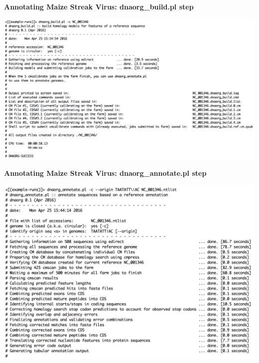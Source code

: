 \documentclass[landscape]{slides}
\begin{document}
\begin{slide}
\begin{center}
\textbf{Annotating Maize Streak Virus: dnaorg\_build.pl step} 

\includegraphics[width=10.5in]{figs/dnaorg-build-output}

\end{center}
\vfill
\end{slide}
\begin{slide}
\begin{center}
\textbf{Annotating Maize Streak Virus: dnaorg\_annotate.pl step} 

\includegraphics[width=10.5in]{figs/dnaorg-annotate-output1}

\end{center}
\vfill
\end{slide}
\end{document}
